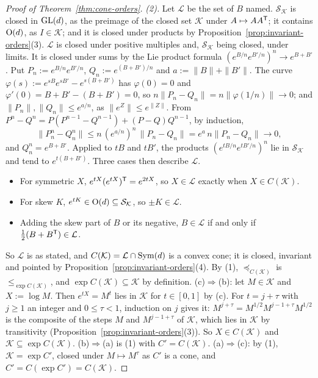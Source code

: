 \begin{proof}[Proof of Theorem~\ref{thm:cone-orders}]
\emph{(2).} Let $\mathcal L$ be the set of $B$ named. $\mathcal S_{\mathcal K}$ is closed in $\mathrm{GL}(d)$, as
the preimage of the closed set $\mathcal K$ under $A \mapsto AA^{\mathsf{T}}$; it contains $\mathrm{O}(d)$, as
$I \in \mathcal K$; and it is closed under products by Proposition~\ref{prop:invariant-orders}(3). $\mathcal L$ is closed
under positive multiples and, $\mathcal S_{\mathcal K}$ being closed, under limits. It is closed under
sums by the Lie product formula $(e^{B/n}e^{B'/n})^n \to e^{B+B'}$. Put $P_n := e^{B/n}e^{B'/n}$,
$Q_n := e^{(B+B')/n}$ and $a := \|B\| + \|B'\|$. The curve $\varphi(s) := e^{sB}e^{sB'} - e^{s(B+B')}$ has
$\varphi(0) = 0$ and $\varphi'(0) = B + B' - (B + B') = 0$, so $n\|P_n - Q_n\| = n\|\varphi(1/n)\| \to 0$; and
$\|P_n\|, \|Q_n\| \le e^{a/n}$, as $\|e^Z\| \le e^{\|Z\|}$. From $P^n - Q^n = P(P^{n-1} - Q^{n-1}) + (P - Q)Q^{n-1}$,
by induction,
\[
  \|P_n^n - Q_n^n\| \le n\,(e^{a/n})^n\,\|P_n - Q_n\| = e^a\,n\|P_n - Q_n\| \to 0 ,
\]
and $Q_n^n = e^{B+B'}$. Applied to $tB$ and $tB'$, the products $(e^{tB/n}e^{tB'/n})^n$ lie in $\mathcal S_{\mathcal K}$ and tend to $e^{t(B+B')}$. Three cases then describe $\mathcal L$.
\begin{itemize}
\item For symmetric $X$, $e^{tX}(e^{tX})^{\mathsf{T}} = e^{2tX}$, so $X \in \mathcal L$ exactly when
$X \in C(\mathcal K)$.
\item For skew $K$, $e^{tK} \in \mathrm{O}(d) \subseteq \mathcal S_{\mathcal K}$, so $\pm K \in \mathcal L$.
\item Adding the skew part of $B$ or its negative, $B \in \mathcal L$ if and only if
$\frac12(B + B^{\mathsf{T}}) \in \mathcal L$.
\end{itemize} So $\mathcal L$ is as stated, and $C(\mathcal K) = \mathcal L \cap
\mathrm{Sym}(d)$ is a convex cone; it is closed, invariant and pointed by Proposition~\ref{prop:invariant-orders}(4). By
(1), $\preceq_{C(\mathcal K)}$ is $\le_{\exp C(\mathcal K)}$, and $\exp C(\mathcal K) \subseteq \mathcal K$ by
definition. (c)$\Rightarrow$(b): let $M \in \mathcal K$ and $X := \log M$. Then $e^{tX} = M^t$ lies in
$\mathcal K$ for $t \in [0,1]$ by (c). For $t = j + \tau$ with $j \ge 1$ an integer and $0 \le \tau < 1$,
induction on $j$ gives it: $M^{j+\tau} = M^{1/2}M^{j-1+\tau}M^{1/2}$ is the composite of the steps $M$ and
$M^{j-1+\tau}$ of $\mathcal K$, which lies in $\mathcal K$ by transitivity
(Proposition~\ref{prop:invariant-orders}(3)). So $X \in C(\mathcal K)$ and $\mathcal K \subseteq \exp C(\mathcal K)$. (b)$\Rightarrow$(a) is (1) with $C' = C(\mathcal K)$.
(a)$\Rightarrow$(c): by (1), $\mathcal K = \exp C'$, closed under $M \mapsto M^\tau$ as $C'$ is a cone, and
$C' = C(\exp C') = C(\mathcal K)$.


\end{proof}
